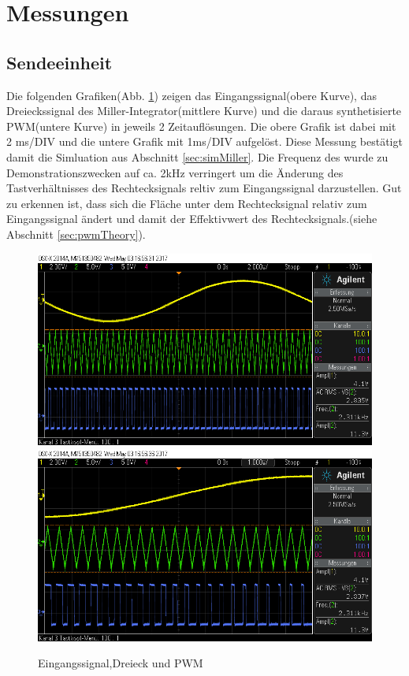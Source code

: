 \section{Messungen}

\subsection{Sendeeinheit}
Die folgenden Grafiken(Abb. \ref{fig:measMiller}) zeigen das Eingangssignal(obere Kurve), das Dreieckssignal des Miller-Integrator(mittlere Kurve) und die daraus synthetisierte PWM(untere Kurve) in jeweils 2 Zeitauflösungen. Die obere Grafik ist dabei mit 2 ms/DIV und die untere Grafik mit 1ms/DIV aufgelöst. Diese Messung bestätigt damit die Simluation aus Abschnitt \ref{sec:simMiller}. Die Frequenz des wurde zu Demonstrationszwecken auf ca. 2kHz verringert um die Änderung des Tastverhältnisses des Rechtecksignals reltiv zum Eingangssignal darzustellen. Gut zu erkennen ist, dass sich die Fläche unter dem Rechtecksignal relativ zum Eingangssignal ändert und damit der Effektivwert des Rechtecksignals.(siehe Abschnitt \ref{sec:pwmTheory}).
\begin{figure}[H]
	\centering
	\includegraphics[scale=0.45]{gfx/osziScreens/scope_3.png}
	\includegraphics[scale=0.45]{gfx/osziScreens/scope_4.png}
	\caption{Eingangssignal,Dreieck und PWM}
	\label{fig:measMiller}
\end{figure}
